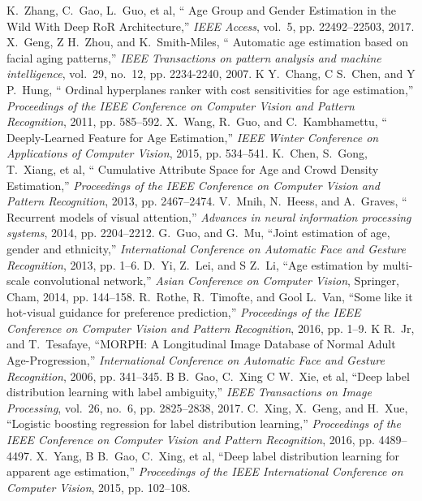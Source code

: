 \documentclass[journal]{IEEEtran}
\begin{document}
\begin{thebibliography}{1}
K.~Zhang, C.~Gao, L.~Guo, et al, `` Age Group and Gender Estimation in the Wild With Deep RoR Architecture,'' \emph{IEEE Access}, vol.~5, pp. 22492--22503, 2017.
X.~Geng, Z H.~Zhou, and K.~Smith-Miles, `` Automatic age estimation based on facial aging patterns,'' \emph{IEEE Transactions on pattern analysis and machine intelligence}, vol.~29, no.~12, pp. 2234-2240, 2007.
K Y.~Chang, C S.~Chen, and Y P.~Hung, `` Ordinal hyperplanes ranker with cost sensitivities for age estimation,'' \emph{Proceedings of the IEEE Conference on Computer Vision and Pattern Recognition}, 2011, pp. 585--592.
X.~Wang, R.~Guo, and C.~Kambhamettu, `` Deeply-Learned Feature for Age Estimation,'' \emph{IEEE Winter Conference on Applications of Computer Vision}, 2015, pp. 534--541.
K.~Chen, S.~Gong, T.~Xiang, et al, `` Cumulative Attribute Space for Age and Crowd Density Estimation,'' \emph{Proceedings of the IEEE Conference on Computer Vision and Pattern Recognition}, 2013, pp. 2467--2474.
V.~Mnih, N.~Heess, and A.~Graves, `` Recurrent models of visual attention,'' \emph{Advances in neural information processing systems}, 2014, pp. 2204--2212.
G.~Guo, and G.~Mu, ``Joint estimation of age, gender and ethnicity,'' \emph{International Conference on Automatic Face and Gesture Recognition}, 2013, pp. 1--6.
D.~Yi, Z.~Lei, and S Z.~Li, ``Age estimation by multi-scale convolutional network,'' \emph{Asian Conference on Computer Vision}, Springer, Cham, 2014, pp. 144--158.
R.~Rothe, R.~Timofte, and Gool L.~Van, ``Some like it hot-visual guidance for preference prediction,'' \emph{Proceedings of the IEEE Conference on Computer Vision and Pattern Recognition}, 2016, pp. 1--9.
K R.~Jr, and T.~Tesafaye, ``MORPH: A Longitudinal Image Database of Normal Adult Age-Progression,'' \emph{International Conference on Automatic Face and Gesture Recognition}, 2006, pp. 341--345.
B B.~Gao, C.~Xing C W.~Xie, et al, ``Deep label distribution learning with label ambiguity,'' \emph{IEEE Transactions on Image Processing}, vol.~26, no.~6, pp. 2825--2838, 2017.
C.~Xing, X.~Geng, and H.~Xue, ``Logistic boosting regression for label distribution learning,'' \emph{Proceedings of the IEEE Conference on Computer Vision and Pattern Recognition}, 2016, pp. 4489--4497.
X.~Yang, B B.~Gao, C.~Xing, et al, ``Deep label distribution learning for apparent age estimation,'' \emph{Proceedings of the IEEE International Conference on Computer Vision}, 2015, pp. 102--108.

\end{thebibliography}
\end{document}
